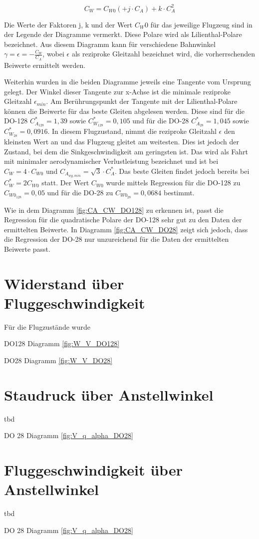 \begin{equation}
C_W = C_{W0} (+ j \cdot C_A) + k \cdot C_{A}^2
\end{equation}

Die Werte der Faktoren j, k und der Wert $C_W0$ für das jeweilige Flugzeug sind in der Legende der Diagramme vermerkt. Diese Polare wird als Lilienthal-Polare bezeichnet. Aus diesem Diagramm kann für verschiedene Bahnwinkel $\gamma = \epsilon = - \frac{C_W}{C_A}$, wobei $\epsilon$ als reziproke Gleitzahl bezeichnet wird, die vorherrschenden Beiwerte ermittelt werden. 

Weiterhin wurden in die beiden Diagramme jeweils eine Tangente vom Ursprung gelegt. Der Winkel dieser Tangente zur x-Achse ist die minimale reziproke Gleitzahl $\epsilon_{min}$. Am Berührungspunkt der Tangente mit der Lilienthal-Polare können die Beiwerte für das beste Gleiten abgelesen werden. Diese sind für die DO-128 $C_{A_{128}}^* = 1,39$ sowie $C_{W_{128}}^* = 0,105$ und für die DO-28 $C_{A_{28}}^* = 1,045$ sowie $C_{W_{28}}^* = 0,0916$. In diesem Flugzustand, nimmt die reziproke Gleitzahl $\epsilon$ den kleinsten Wert an und das Flugzeug gleitet am weitesten. Dies ist jedoch der Zustand, bei dem die Sinkgeschwindigkeit am geringsten ist. Das wird als Fahrt mit minimaler aerodynamischer Verlustleistung bezeichnet und ist bei $C_W = 4 \cdot C_{W0}$ und $C_{A_{wg,min}} = \sqrt{3} \cdot C_A^*$. Das beste Gleiten findet jedoch bereits bei $C_W^* = 2 C_{W0}$ statt. Der Wert $C_{W0}$ wurde mittels Regression für die DO-128 zu $C_{W0_{128}} = 0,05$ und für die DO-28 zu $C_{W0_{28}} = 0,0684$ bestimmt. 


Wie in dem Diagramm \ref{fig:CA_CW_DO128} zu erkennen ist, passt die Regression für die quadratische Polare der DO-128 sehr gut zu den Daten der ermittelten Beiwerte. In Diagramm \ref{fig:CA_CW_DO28} zeigt sich jedoch, dass die Regression der DO-28 nur unzureichend für die Daten der ermittelten Beiwerte passt.


\section{Widerstand über Fluggeschwindigkeit}
Für die Flugzustände wurde 

DO128 Diagramm \ref{fig:W_V_DO128}

DO28 Diagramm \ref{fig:W_V_DO28}

\section{Staudruck über Anstellwinkel}
tbd

DO 28 Diagramm \ref{fig:V_q_alpha_DO28}

\section{Fluggeschwindigkeit über Anstellwinkel}
tbd

DO 28 Diagramm \ref{fig:V_q_alpha_DO28}



